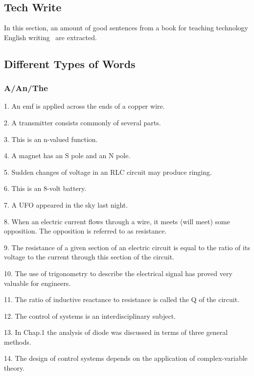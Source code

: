 \documentclass[a4paper,twocolumn,10pt]{article}
\begin{document}
\begin{CJK}{UTF8}{gkai}

\tableofcontents

\section{Tech Write}

In this section, an amount of good sentences from a book
for teaching technology English writing~\cite{bib:techwrite.xidian} are extracted.

	\subsection{Different Types of Words}

	\subsubsection{A/An/The}

	1. An emf is applied across the ends of a copper wire.

	2. A transmitter consists commonly of several parts. 

	3. This is an n-valued function.

	4. A magnet has an S pole and an N pole.

	5. Sudden changes of voltage in an RLC circuit may produce ringing.

	6. This is an 8-volt battery.

	7. A UFO appeared in the sky last night.

	8. When an electric current flows through a wire, it meets (will meet)
	some opposition. The opposition is referred to as resistance.

	9. The resistance of a given section of an electric circuit is equal
	to the ratio of its voltage to the current through this section of the 
	circuit.

	10. The use of trigonometry to describe the electrical signal has proved
	very valuable for engineers.

	11. The ratio of inductive reactance to resistance is called the Q of the
	circuit.

	12. The control of systems is an interdisciplinary subject.
	
	13. In Chap.1 the analysis of diode was discussed in terms of three general methods.

	14. The design of control systems depends on the application of complex-variable
	theory.


\end{CJK}
\end{document}
